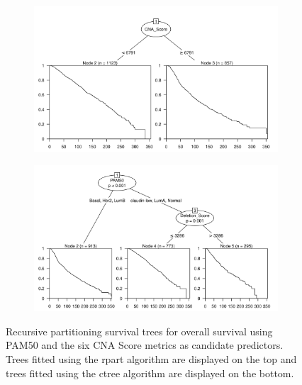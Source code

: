 \begin{figure}[!htb]
\centering

\vspace{0.5cm}

\begin{subfigure}{\textwidth}
\subcaption{}
\includegraphics[width=1\textwidth]{../figures/Appendices/Appendix_B/PartyKit_Survival_Score_OS_PAM50.png}
\end{subfigure}

\vspace{2cm}

\begin{subfigure}{\textwidth}
\subcaption{}
\includegraphics[width=1\textwidth]{../figures/Appendices/Appendix_B/Ctree_Survival_Score_OS_PAM50.png}
\end{subfigure}

\vspace{0.5cm}

\caption[Recursive partitioning survival trees for overall survival using PAM50 and the 6 CNA Score metrics as candidate predictors.]{Recursive partitioning survival trees for overall survival using PAM50 and the six CNA Score metrics as candidate predictors. Trees fitted using the rpart algorithm are displayed on the top and trees fitted using the ctree algorithm are displayed on the bottom.}
\end{figure}

